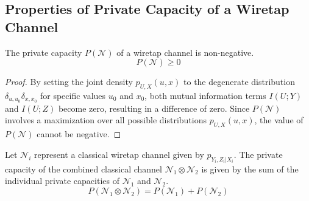 \subsection{Properties of Private Capacity of a Wiretap Channel}

\begin{theorem}
The private capacity $P(\mathcal{N})$ of a wiretap channel is non-negative.
$$P(\mathcal{N}) \geq 0$$
\end{theorem}

\begin{proof}
By setting the joint density $p_{U,X}(u, x)$ to the degenerate distribution $\delta_{u,u_0} \delta_{x,x_0}$ for specific values $u_0$ and $x_0$, both mutual information terms $I(U; Y)$ and $I(U; Z)$ become zero, resulting in a difference of zero. Since $P(\mathcal{N})$ involves a maximization over all possible distributions $p_{U,X}(u, x)$, the value of $P(\mathcal{N})$ cannot be negative.
\end{proof}

\begin{theorem}[Additivity]
Let $\mathcal{N}_i$ represent a classical wiretap channel given by $p_{Y_i, Z_i | X_i}$. The private capacity of the combined classical channel $\mathcal{N}_1 \otimes \mathcal{N}_2$ is given by the sum of the individual private capacities of $\mathcal{N}_1$ and $\mathcal{N}_2$.
$$P(\mathcal{N}_1 \otimes \mathcal{N}_2) = P(\mathcal{N}_1) + P(\mathcal{N}_2)$$
\end{theorem}

